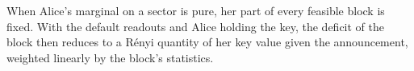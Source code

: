 
When Alice's marginal on a sector is pure, her part of every feasible block
is fixed. With the default readouts and Alice holding the key, the deficit
of the block then reduces to a Rényi quantity of her key value given the
announcement, weighted linearly by the block's statistics.

